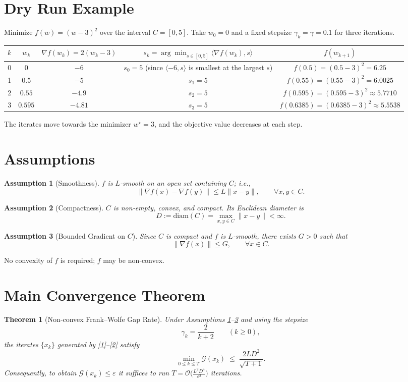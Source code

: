 \documentclass{article}
\newtheorem{theorem}{Theorem}
\newtheorem{assumption}{Assumption}
\newcommand{\gap}{\mathcal{G}}
\newcommand{\diam}{\mathrm{diam}}
\begin{document}
\section*{Dry Run Example}
Minimize $f(w) = (w-3)^2$ over the interval $C=[0,5]$.  
Take $w_0=0$ and a fixed stepsize $\gamma_k=\gamma=0.1$ for three iterations.

\begin{center}
\begin{tabular}{c|c|c|c|c}
$k$ & $w_k$ & $\nabla f(w_k)=2(w_k-3)$ & $s_k=\arg\min_{s\in[0,5]}\langle\nabla f(w_k),s\rangle$ & $f(w_{k+1})$ \\ \hline
0 & $0$   & $-6$ & $s_0=5$ (since $\langle-6,s\rangle$ is smallest at the largest $s$) & $f(0.5)= (0.5-3)^2 = 6.25$ \\[4pt]
1 & $0.5$ & $-5$ & $s_1=5$ & $f(0.55)= (0.55-3)^2 = 6.0025$ \\[4pt]
2 & $0.55$& $-4.9$& $s_2=5$ & $f(0.595)= (0.595-3)^2 \approx 5.7710$ \\[4pt]
3 & $0.595$& $-4.81$& $s_3=5$ & $f(0.6385)= (0.6385-3)^2 \approx 5.5538$
\end{tabular}
\end{center}
The iterates move towards the minimizer $w^\star=3$, and the objective value decreases at each step.

\newpage
\section*{Assumptions}
\begin{assumption}[Smoothness]\label{ass:smooth}
$f$ is $L$‑smooth on an open set containing $C$; i.e.,
\[
\|\nabla f(x)-\nabla f(y)\|\le L\|x-y\|,\qquad\forall x,y\in C .
\]
\end{assumption}

\begin{assumption}[Compactness]\label{ass:compact}
$C$ is non‑empty, convex, and compact.  Its Euclidean diameter is
\[
D := \diam(C)=\max_{x,y\in C}\|x-y\| <\infty .
\]
\end{assumption}

\begin{assumption}[Bounded Gradient on $C$]\label{ass:gradbound}
Since $C$ is compact and $f$ is $L$‑smooth, there exists $G>0$ such that
\[
\|\nabla f(x)\|\le G,\qquad\forall x\in C .
\]
\end{assumption}

No convexity of $f$ is required; $f$ may be non‑convex.

\section*{Main Convergence Theorem}
\begin{theorem}[Non‑convex Frank–Wolfe Gap Rate]\label{thm:rate}
Under Assumptions \ref{ass:smooth}–\ref{ass:gradbound} and using the stepsize
\[
\gamma_k = \frac{2}{k+2}\qquad (k\ge0),
\]
the iterates $\{x_k\}$ generated by \eqref{1}–\eqref{2} satisfy
\[
\min_{0\le k\le T}\gap(x_k)\;\le\;
\frac{2LD^2}{\sqrt{T+1}} .
\]
Consequently, to obtain $\gap(x_k)\le\varepsilon$ it suffices to run
$T = \mathcal{O}\!\big(\tfrac{L^2D^4}{\varepsilon^{2}}\big)$ iterations.
\end{theorem}
\end{document}
